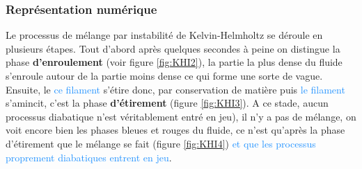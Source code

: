 \documentclass{rapportECC}
\newcommand{\FAadd}[1]{\textcolor{DodgerBlue}{{#1}}}                     %
\begin{document}
\subsubsection{Représentation numérique}
Le processus de mélange par instabilité de Kelvin-Helmholtz se déroule en plusieurs étapes. Tout d'abord après quelques secondes à peine on distingue la phase \textbf{d'enroulement} (voir figure \ref{fig:KHI2}), la partie la plus dense du fluide s'enroule autour de la partie moins dense ce qui forme une sorte de vague. Ensuite, le \FAadd{ce filament} s'étire donc, par conservation de matière puis \FAadd{le filament} s'amincit, c'est la phase \textbf{d'étirement} (figure \ref{fig:KHI3}). A ce stade, aucun processus diabatique n'est véritablement entré en jeu), il n'y a pas de mélange, on voit encore bien les phases bleues et rouges du fluide, ce n'est qu'après la phase d'étirement que le mélange se fait (figure \ref{fig:KHI4}) \FAadd{et que les processus proprement diabatiques entrent en jeu}.
\end{document}
